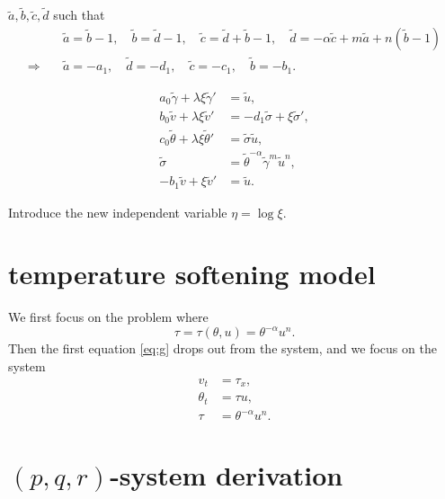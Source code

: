 \documentclass[a4paper,11pt]{article}
\def\tg{{\tilde{\gamma}}}
\def\tv{{\tilde{v}}}
\def\tth{{\tilde{\theta}}}
\def\ts{{\tilde{\sigma}}}
\def\tu{{\tilde{u}}}
\def\ta{{\tilde{a}}}
\def\tb{{\tilde{b}}}
\def\tc{{\tilde{c}}}
\def\td{{\tilde{d}}}
\begin{document}
$\ta, \tb, \tc, \td$ such that
\begin{align*}
 &\ta=\tb-1, \quad \tb=\td-1, \quad \tc=\td+\tb-1,\quad \td = -\alpha \tc + m\ta +n(\tb-1) \\
 \Longrightarrow \quad&\ta = -a_1, \quad \td = -d_1, \quad \tc = -c_1, \quad \tb=-b_1.
\end{align*}

\begin{equation} \label{eq:tildesys}
 \begin{aligned}
  a_0\tg + \lambda\xi\tg' &=\tu,\\
  b_0\tv + \lambda\xi\tv' &=-d_1 \ts + \xi\ts',\\
  c_0\tth+ \lambda\xi\tth'&=\ts\tu,\\
  \ts &=\tth^{-\alpha}\tg^m\tu^n,\\
  -b_1\tv+\xi\tv' &= \tu.
 \end{aligned}
\end{equation}

Introduce the new independent variable $\eta = \log\xi$.

\section{temperature softening model}
We first focus on the problem where 
$$ \tau = \tau(\theta,u) = \theta^{-\alpha}u^n.$$
Then the first equation \eqref{eq:g} drops out from the system, and we focus on the system
\begin{equation} \label{eq:orisys}
 \begin{aligned}
  v_t &= \tau_x,\\
  \theta_t &= \tau u,\\
  \tau &=\theta^{-\alpha}u^n.
 \end{aligned}
\end{equation}


\section{$(p,q,r)$-system derivation}
\end{document}
